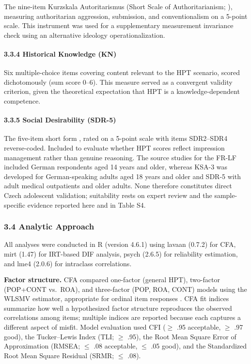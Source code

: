 \documentclass[
  12pt,
]{article}
\newcommand{\Loc}[1]{\linelabel{loc:#1}}
\newcommand{\LocEnd}[1]{\linelabel{loc:#1:end}}
\begin{document}
The nine-item Kurzskala Autoritarismus (Short Scale of
Authoritarianism; \citealp{Beierlein_et_al2014Die_Kurzskala}), measuring authoritarian
aggression, submission, and conventionalism on a 5-point scale. This instrument was used for a supplementary measurement invariance check using an alternative ideology operationalization.

\hypertarget{historical-knowledge-kn}{%
\paragraph{3.3.4 Historical Knowledge (KN)}\label{historical-knowledge-kn}}

Six multiple-choice items covering content relevant to the HPT scenario, scored dichotomously (sum score 0--6). This measure served as a convergent validity criterion, given the theoretical expectation that HPT is a knowledge-dependent competence.

\hypertarget{social-desirability-sdr-5}{%
\paragraph{3.3.5 Social Desirability (SDR-5)}\label{social-desirability-sdr-5}}

The five-item short form \citep{Hays_et_al1989A_Five}, rated on a 5-point scale with items SDR2--SDR4 reverse-coded. Included to evaluate whether HPT scores reflect impression management rather than genuine reasoning. \Loc{s335-sources}The source studies for the FR-LF included German respondents aged 14 years and older, whereas KSA-3 was developed for German-speaking adults aged 18 years and older and SDR-5 with adult medical outpatients and older adults. None therefore constitutes direct Czech adolescent validation; suitability rests on expert review and the sample-specific evidence reported here and in Table S4.\LocEnd{s335-sources}

\hypertarget{analytic-approach}{%
\subsubsection{3.4 Analytic Approach}\label{analytic-approach}}

All analyses were conducted in R (version 4.6.1) using lavaan (0.7.2) for
CFA, mirt (1.47) for IRT-based DIF analysis, psych (2.6.5) for reliability
estimation, and lme4 (2.0.6) for intraclass correlations.

\textbf{Factor structure.} CFA compared one-factor (general HPT), two-factor (POP+CONT vs.~ROA), and three-factor (POP, ROA, CONT) models using the WLSMV estimator, appropriate for ordinal item responses \citep{Flora2004}. CFA fit indices summarize how well a hypothesized factor structure reproduces the observed correlations among items; multiple indices are reported because each captures a different aspect of misfit. Model evaluation used CFI (\(\geq\) .95 acceptable, \(\geq\) .97
good), the Tucker--Lewis Index (TLI; \(\geq\) .95), the Root Mean
Square Error of Approximation (RMSEA; \(\leq\) .08 acceptable,
\(\leq\) .05 good), and the Standardized Root Mean Square Residual
(SRMR; \(\leq\) .08).
\end{document}
